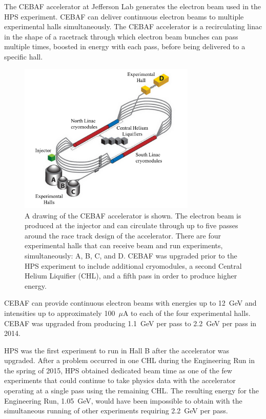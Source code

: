 The CEBAF accelerator at Jefferson Lab generates the electron beam used in the HPS experiment. CEBAF can deliver continuous electron beams to multiple experimental halls simultaneously. The CEBAF accelerator is a recirculating linac in the shape of a racetrack through which electron beam bunches can pass multiple times, boosted in energy with each pass, before being delivered to a specific hall. 

\begin{figure}[htb]
  \centering
      \includegraphics[width=0.75\textwidth]{pics/experiment/cebafLabel.png}
  \caption[CEBAF accelerator]{A drawing of the CEBAF accelerator is shown. The electron beam is produced at the injector and can circulate through up to five passes around the race track design of the accelerator. There are four experimental halls that can receive beam and run experiments, simultaneously: A, B, C, and D. CEBAF was upgraded prior to the HPS experiment to include additional cryomodules, a second Central Helium Liquifier (CHL), and a fifth pass in order to produce higher energy.}
  \label{Figure:cebaf}
\end{figure}

CEBAF can provide continuous electron beams with energies up to 12~GeV and intensities up to approximately 100~$\mu$A to each of the four experimental halls. CEBAF was upgraded from producing 1.1~GeV per pass to 2.2~GeV per pass in 2014. 

HPS was the first experiment to run in Hall B after the accelerator was upgraded. After a problem occurred in one CHL during the Engineering Run in the spring of 2015, HPS obtained dedicated beam time as one of the few experiments that could continue to take physics data with the accelerator operating at a single pass using the remaining CHL. The resulting energy for the Engineering Run, 1.05~GeV, would have been impossible to obtain with the simultaneous running of other experiments requiring 2.2~GeV per pass.  
